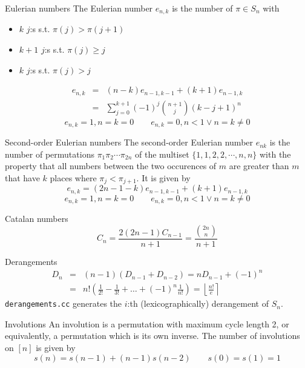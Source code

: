 \begin{algorithm}{Eulerian numbers}
\desc
The Eulerian number $e_{n,k}$ is the number of $\pi \in S_n$ with
\begin{itemize}
\item $k$ $j$:s s.t. $\pi(j) > \pi(j+1)$
\item $k+1$ $j$:s s.t. $\pi(j) \ge j$
\item $k$ $j$:s s.t. $\pi(j) > j$
\end{itemize}
\begin{eqnarray*}
e_{n,k} & = & (n-k)e_{n-1,k-1} + (k+1) e_{n-1, k}\\
        & = & \sum_{j=0}^{k+1}(-1)^j \binom{n+1}{j} (k - j + 1)^n
\end{eqnarray*}
$$e_{n,k} = 1, n = k = 0 \qquad e_{n,k} = 0, n < 1 \vee n = k \ne 0$$
\end{algorithm}

\begin{algorithm}{Second-order Eulerian numbers}
\desc
The second-order Eulerian number $e_{nk}$ is the number of
permutations $\pi_1 \pi_2 \cdots \pi_{2n}$ of the multiset
$\{1,1,2,2,\cdots,n,n\}$ with the property that all numbers between
the two occurences of $m$ are greater than $m$ that have $k$ places
where $\pi_j < \pi_{j+1}$. It is given by
$$e_{n,k} = (2n-1-k)e_{n-1,k-1} + (k+1) e_{n-1, k}$$
$$e_{n,k} = 1, n = k = 0 \qquad e_{n,k} = 0, n < 1 \vee n = k \ne 0$$
\end{algorithm}

\begin{algorithm}{Catalan numbers}
\desc
$$C_n = \frac{2(2n-1)C_{n-1}}{n+1} = \frac{\binom{2n}{n}}{\scriptstyle n+1}$$
\end{algorithm}

\begin{algorithm}{Derangements}
\desc
\begin{eqnarray*}
D_n & = & (n-1)(D_{n-1}+D_{n-2}) = nD_{n-1} + (-1)^n \\
    & = & n!\left(\frac 1{2!}-\frac 1{3!}+\ldots+(-1)^n\frac 1{n!}\right) =
\left\lfloor\frac{n!}{e}\right\rceil
\end{eqnarray*}
{\tt derangements.cc} generates the $i$:th (lexicographically)
derangement of $S_n$.
\end{algorithm}

\begin{algorithm}{Involutions}
\desc
An involution is a permutation with maximum cycle length 2, or
equivalently, a permutation which is its own inverse.  The number of
involutions on $[n]$ is given by
$$s(n) = s(n-1) + (n-1)s(n-2) \qquad s(0) = s(1) = 1$$
\end{algorithm}

